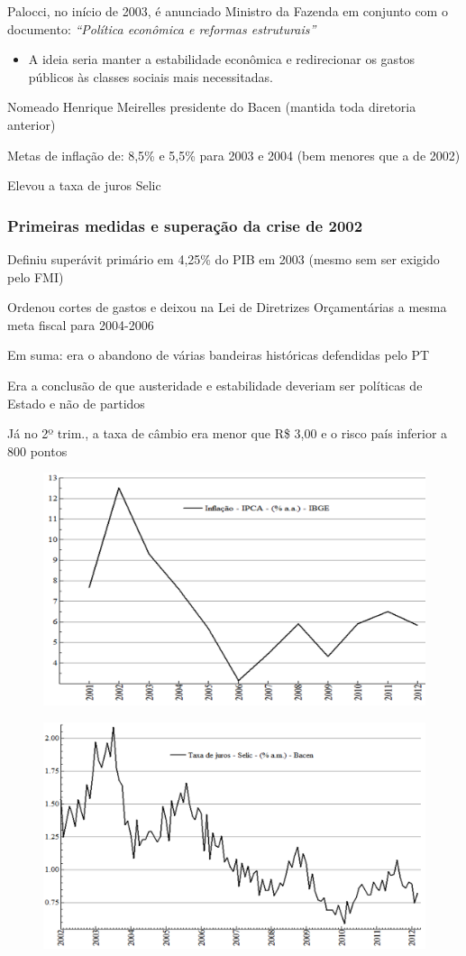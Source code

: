 \documentclass[a4paper,12pt]{article}[abntex2]
\begin{document}
Palocci, no início de 2003, é anunciado Ministro da Fazenda em conjunto com o documento: 
\textit{``Política econômica e reformas estruturais''}

\begin{itemize}
    \item A ideia seria manter a estabilidade econômica e redirecionar os gastos públicos às classes sociais mais necessitadas.
\end{itemize}

Nomeado Henrique Meirelles presidente do Bacen (mantida toda diretoria anterior)

Metas de inflação de: 8,5\% e 5,5\% para 2003 e 2004 (bem menores que a de 2002)

Elevou a taxa de juros Selic

\subsubsection{\textbf{Primeiras medidas e superação da crise de 2002}}
Definiu superávit primário em 4,25\% do PIB em 2003 (mesmo sem ser exigido pelo FMI)

Ordenou cortes de gastos e deixou na Lei de Diretrizes Orçamentárias a mesma meta fiscal para 2004-2006

Em suma: era o abandono de várias bandeiras históricas defendidas pelo PT

Era a conclusão de que austeridade e estabilidade deveriam ser políticas de Estado e não de partidos

Já no 2º trim., a taxa de câmbio era menor que R\$ 3,00 e o risco país inferior a 800 pontos

\begin{figure}[H]
    \centering
    \includegraphics[width=0.7\linewidth]{Imagens/a16i3.png}
\end{figure}

\begin{figure}[H]
    \centering
    \includegraphics[width=0.7\linewidth]{Imagens/a16i4.png}
\end{figure}
\end{document}
